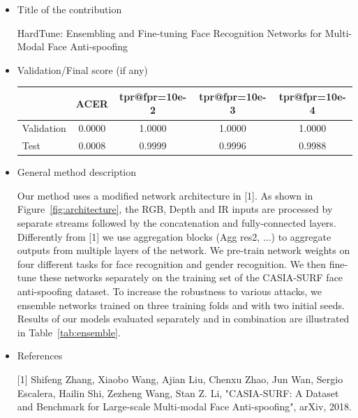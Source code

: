 \documentclass{article}
\begin{document}
\begin{itemize}
\item Title of the contribution

HardTune: Ensembling and Fine-tuning Face Recognition Networks for Multi-Modal Face Anti-spoofing

\item Validation/Final score (if any)

\begin{tabular}{l*{4}{c}}	
             & ACER & tpr@fpr=10e-2 & tpr@fpr=10e-3 & tpr@fpr=10e-4 \\
\hline
Validation   & 0.0000 & 1.0000 & 1.0000 & 1.0000 \\
Test         & 0.0008 & 0.9999 & 0.9996 & 0.9988 \\
\end{tabular}


\item General method description

Our method uses a modified network architecture in [1].
As shown in Figure~\ref{fig:architecture}, the RGB, Depth and IR inputs are processed by separate streams followed by the concatenation and fully-connected layers.
Differently from [1] we use aggregation blocks (Agg res2, ...) to aggregate outputs from multiple layers of the network.
We pre-train network weights on four different tasks for face recognition and gender recognition. 
We then fine-tune these networks separately on the training set of the CASIA-SURF face anti-spoofing dataset.
To increase the robustness to various attacks, we ensemble networks trained on three training folds and with two initial seeds. 
Results of our models evaluated separately and in combination are illustrated in Table~\ref{tab:ensemble}.


\item References

[1] Shifeng Zhang, Xiaobo Wang, Ajian Liu, Chenxu Zhao, Jun Wan, Sergio Escalera, Hailin Shi, Zezheng Wang, Stan Z. Li, "CASIA-SURF: A Dataset and Benchmark for Large-scale Multi-modal Face Anti-spoofing", arXiv, 2018. \\


\end{itemize}
\end{document}
